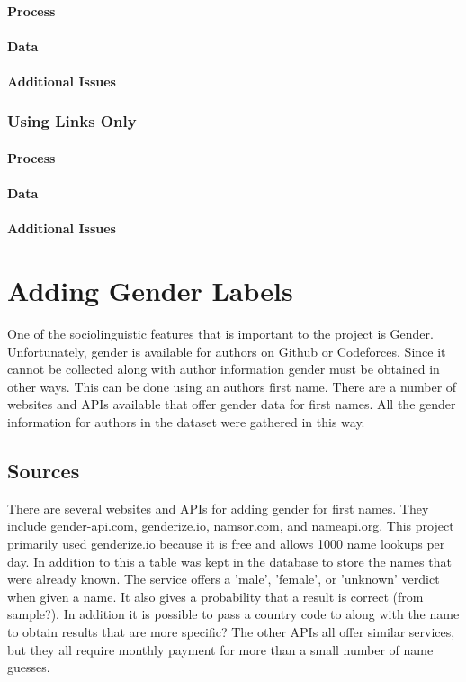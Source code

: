 \documentclass{article}
\begin{document}
\paragraph{Process}
\paragraph{Data}
\paragraph{Additional Issues}

\subsubsection{Using Links Only}

\paragraph{Process}
\paragraph{Data}
\paragraph{Additional Issues}


\section{Adding Gender Labels}
One of the sociolinguistic features that is important to the project is Gender. Unfortunately, gender is available for authors on Github or Codeforces. Since it cannot be collected along with author information gender must be obtained in other ways. This can be done using an authors first name. There are a number of websites and APIs available that offer gender data for first names. All the gender information for authors in the dataset were gathered in this way.

\subsection{Sources}
There are several websites and APIs for adding gender for first names. They include gender-api.com, genderize.io, namsor.com, and nameapi.org. This project primarily used genderize.io because it is free and allows 1000 name lookups per day. In addition to this a table was kept in the database to store the names that were already known. The service offers a 'male', 'female', or 'unknown' verdict when given a name. It also gives a probability that a result is correct (from sample?). In addition it is possible to pass a country code to along with the name to obtain results that are more specific? The other APIs all offer similar services, but they all require monthly payment for more than a small number of name guesses.
\end{document}
